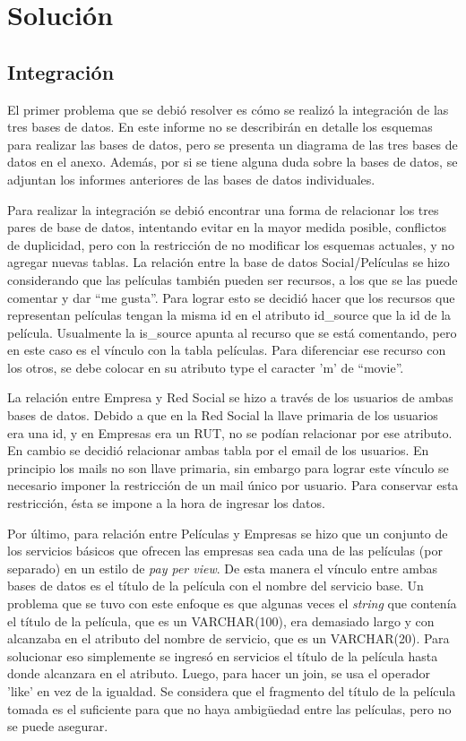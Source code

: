 \documentclass[12pt,letterpaper]{article}
\begin{document}
\section{Solución}

\subsection{Integración}

El primer problema que se debió resolver es cómo se realizó la integración de las tres bases de datos. En este informe no se describirán en detalle los esquemas para realizar las bases de datos, pero se presenta un diagrama de las tres bases de datos en el anexo.
Además, por si se tiene alguna duda sobre la bases de datos, se adjuntan los informes anteriores de las bases de datos individuales.

Para realizar la integración se debió encontrar una forma de relacionar los tres pares de base de datos, intentando evitar en la mayor medida posible, conflictos de duplicidad, pero con la restricción de no modificar los esquemas actuales, y no agregar nuevas tablas. La relación entre la base de datos Social/Películas se hizo considerando que las películas también pueden ser recursos, a los que se las puede comentar y dar ``me gusta''. Para lograr esto se decidió hacer que los recursos que representan películas tengan la misma id en el atributo id\_source que la id de la película. Usualmente la is\_source apunta al recurso que se está comentando, pero en este caso es el vínculo con la tabla películas. Para diferenciar ese recurso con los otros, se debe colocar en su atributo type el caracter 'm' de ``movie''.

La relación entre Empresa y Red Social se hizo a través de los usuarios de ambas bases de datos. Debido a que en la Red Social la llave primaria de los usuarios era una id, y en Empresas era un RUT, no se podían relacionar por ese atributo. En cambio se decidió relacionar ambas tabla por el email de los usuarios. En principio los mails no son llave primaria, sin embargo para lograr este vínculo se necesario imponer la restricción de un mail único por usuario. Para conservar esta restricción, ésta se impone a la hora de ingresar los datos.

Por último, para relación entre Películas y Empresas se hizo que un conjunto de los servicios básicos que ofrecen las empresas sea cada una de las películas (por separado) en un estilo de \emph{pay per view}. De esta manera el vínculo entre ambas bases de datos es el título de la película con el nombre del servicio base. Un problema que se tuvo con este enfoque es que algunas veces el \emph{string} que contenía el título de la película, que es un VARCHAR(100), era demasiado largo y con alcanzaba en el atributo del nombre de servicio, que es un VARCHAR(20). Para solucionar eso simplemente se ingresó en servicios el título de la película hasta donde alcanzara en el atributo. Luego, para hacer un join, se usa el operador 'like' en vez de la igualdad. Se considera que el fragmento del título de la película tomada es el suficiente para que no haya ambigüedad entre las películas, pero no se puede asegurar.
\end{document}

